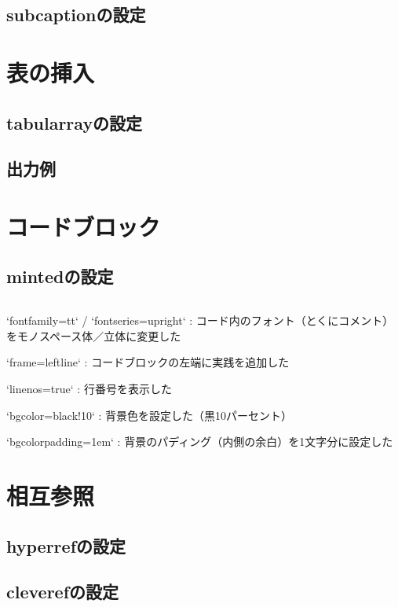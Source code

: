 \documentclass[
    article,
    head_space=25truemm,
    foot_space=10truemm,
    gutter=15truemm]{jlreq}
\begin{document}
\subsection{subcaptionの設定}

\section{表の挿入}

\subsection{tabularrayの設定}

\subsection{出力例}

\section{コードブロック}

\subsection{mintedの設定}

\inputminted{latex}{preamble/minted.tex}

\begin{markdown}
`fontfamily=tt` / `fontseries=upright`
: コード内のフォント（とくにコメント）をモノスペース体／立体に変更した

`frame=leftline`
: コードブロックの左端に実践を追加した

`linenos=true`
: 行番号を表示した

`bgcolor=black!10`
: 背景色を設定した（黒10パーセント）

`bgcolorpadding=1em`
: 背景のパディング（内側の余白）を1文字分に設定した
\end{markdown}


\section{相互参照}

\subsection{hyperrefの設定}

\subsection{cleverefの設定}
\end{document}
